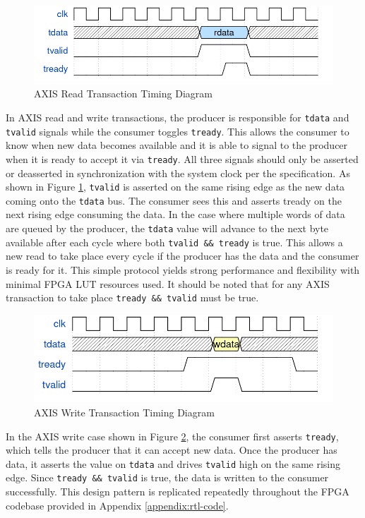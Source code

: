 \documentclass[letterpaper,11pt]{article}
\newcommand{\code}[1]{\texttt{#1}}
\begin{document}
\begin{figure}[H]
  \centering
  \includegraphics[width=\textwidth]{figures/axis_read.png}
  \caption{AXIS Read Transaction Timing Diagram}
  \label{fig:axis-read}
\end{figure}

In AXIS read and write transactions, the producer is responsible for
\code{tdata} and \code{tvalid} signals while the consumer toggles \code{tready}.
This allows the consumer to know when new data becomes available and it is able
to signal to the producer when it is ready to accept it via \code{tready}. All
three signals should only be asserted or deasserted in synchronization with the
system clock per the specification. As shown in Figure \ref{fig:axis-read},
\code{tvalid} is asserted on the same rising edge as the new data coming onto
the \code{tdata} bus. The consumer sees this and asserts tready on the next
rising edge consuming the data. In the case where multiple words of data are
queued by the producer, the \code{tdata} value will advance to the next byte
available after each cycle where both \code{tvalid && tready} is true. This
allows a new read to take place every cycle if the producer has the data and the
consumer is ready for it. This simple protocol yields strong performance and
flexibility with minimal FPGA LUT resources used. It should be noted that for
any AXIS transaction to take place \code{tready && tvalid} must be true.

\begin{figure}[H]
  \centering
  \includegraphics[width=\textwidth]{figures/axis_write.png}
  \caption{AXIS Write Transaction Timing Diagram}
  \label{fig:axis-write}
\end{figure}

In the AXIS write case shown in Figure \ref{fig:axis-write}, the consumer first
asserts \code{tready}, which tells the producer that it can accept new data.
Once the producer has data, it asserts the value on \code{tdata} and drives
\code{tvalid} high on the same rising edge. Since \code{tready && tvalid} is
true, the data is written to the consumer successfully. This design pattern is
replicated repeatedly throughout the FPGA codebase provided in Appendix
\ref{appendix:rtl-code}.
\end{document}
